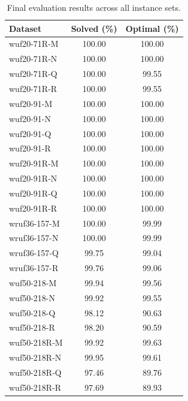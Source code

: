 \documentclass[11pt]{article}
\begin{document}
    \begin{table}[htbp]
        \centering
        \caption{Final evaluation results across all instance sets.}
        \label{tab:final-results}
        \begin{tabular}{lcc}
            \toprule
            Dataset      & Solved (\%) & Optimal (\%) \\
            \midrule
            wuf20-71R-M  & 100.00      & 100.00       \\
            wuf20-71R-N  & 100.00      & 100.00       \\
            wuf20-71R-Q  & 100.00      & 99.55        \\
            wuf20-71R-R  & 100.00      & 99.55        \\
            \midrule
            wuf20-91-M   & 100.00      & 100.00       \\
            wuf20-91-N   & 100.00      & 100.00       \\
            wuf20-91-Q   & 100.00      & 100.00       \\
            wuf20-91-R   & 100.00      & 100.00       \\
            \midrule
            wuf20-91R-M  & 100.00      & 100.00       \\
            wuf20-91R-N  & 100.00      & 100.00       \\
            wuf20-91R-Q  & 100.00      & 100.00       \\
            wuf20-91R-R  & 100.00      & 100.00       \\
            \midrule
            wruf36-157-M & 100.00      & 99.99        \\
            wruf36-157-N & 100.00      & 99.99        \\
            wruf36-157-Q & 99.75       & 99.04        \\
            wruf36-157-R & 99.76       & 99.06        \\
            \midrule
            wuf50-218-M  & 99.94       & 99.56        \\
            wuf50-218-N  & 99.92       & 99.55        \\
            wuf50-218-Q  & 98.12       & 90.63        \\
            wuf50-218-R  & 98.20       & 90.59        \\
            \midrule
            wuf50-218R-M & 99.92       & 99.63        \\
            wuf50-218R-N & 99.95       & 99.61        \\
            wuf50-218R-Q & 97.46       & 89.76        \\
            wuf50-218R-R & 97.69       & 89.93        \\
            \bottomrule
        \end{tabular}
    \end{table}
\end{document}
